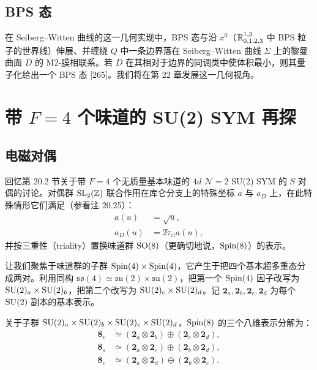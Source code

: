 \subsection{BPS 态}

在 Seiberg–Witten 曲线的这一几何实现中，BPS 态与沿 $x^0$（$\mathbb{R}^{1,3}_{0,1,2,3}$ 中 BPS 粒子的世界线）伸展、并缠绕 $Q$ 中一条边界落在 Seiberg–Witten 曲线 $\Sigma$ 上的黎曼曲面 $D$ 的 M2-膜相联系。若 $D$ 在其相对于边界的同调类中使体积最小，则其量子化给出一个 BPS 态 [265]。我们将在第 22 章发展这一几何视角。

\section{带 $F=4$ 个味道的 SU(2) SYM 再探}

\subsection{电磁对偶}

回忆第 20.2 节关于带 $F=4$ 个无质量基本味道的 $4d$ $\mathcal{N}=2$ SU(2) SYM 的 $S$ 对偶的讨论。对偶群 $\operatorname{SL}_2(\mathbb{Z})$ 联合作用在库仑分支上的特殊坐标 $a$ 与 $a_D$ 上，在此特殊情形它们满足（参看注 20.25）：
\[
\begin{aligned}
a(u)&=\sqrt{u},\\
a_D(u)&=2\tilde\tau_{\mathrm{cl}}a(u),
\end{aligned}
\]
并按三重性（triality）置换味道群 $\operatorname{SO}(8)$（更确切地说，$\operatorname{Spin}(8)$）的表示。

让我们聚焦于味道群的子群 $\operatorname{Spin}(4)\times\operatorname{Spin}(4)$，它产生于把四个基本超多重态分成两对。利用同构 $\mathfrak{so}(4)\simeq\mathfrak{su}(2)\times\mathfrak{su}(2)$，把第一个 $\operatorname{Spin}(4)$ 因子改写为 $\operatorname{SU}(2)_a\times\operatorname{SU}(2)_b$，把第二个改写为 $\operatorname{SU}(2)_c\times\operatorname{SU}(2)_d$。记 $\mathbf{2}_a,\mathbf{2}_b,\mathbf{2}_c,\mathbf{2}_d$ 为每个 $\operatorname{SU}(2)$ 副本的基本表示。

\begin{proposition}[21.15] 关于子群 $\operatorname{SU}(2)_a\times\operatorname{SU}(2)_b\times\operatorname{SU}(2)_c\times\operatorname{SU}(2)_d$，$\operatorname{Spin}(8)$ 的三个八维表示分解为：
\begin{equation}
\begin{aligned}
\mathbf{8}_v&\simeq(\mathbf{2}_a\otimes\mathbf{2}_b)\oplus(\mathbf{2}_c\otimes\mathbf{2}_d),\\
\mathbf{8}_s&\simeq(\mathbf{2}_a\otimes\mathbf{2}_c)\oplus(\mathbf{2}_b\otimes\mathbf{2}_d),\\
\mathbf{8}_c&\simeq(\mathbf{2}_a\otimes\mathbf{2}_d)\oplus(\mathbf{2}_b\otimes\mathbf{2}_c).
\end{aligned}
\tag{21.8}
\end{equation}
\end{proposition}

